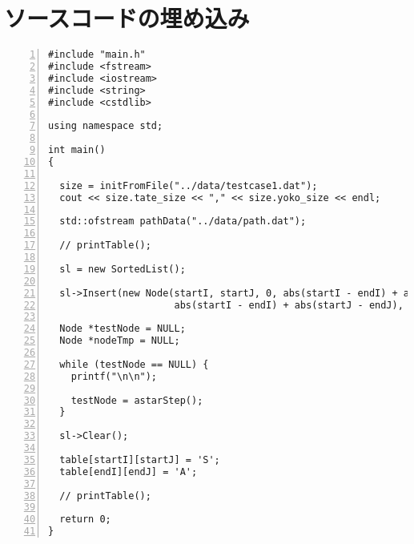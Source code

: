 \documentclass[10pt,a4paper]{jsarticle}
\begin{document}
\section{ソースコードの埋め込み}

\begin{lstlisting}[basicstyle=\ttfamily\footnotesize, frame=single, numbers=left]
#include "main.h"
#include <fstream>
#include <iostream>
#include <string>
#include <cstdlib>

using namespace std;

int main()
{

  size = initFromFile("../data/testcase1.dat");
  cout << size.tate_size << "," << size.yoko_size << endl;

  std::ofstream pathData("../data/path.dat");

  // printTable();

  sl = new SortedList();

  sl->Insert(new Node(startI, startJ, 0, abs(startI - endI) + abs(startJ - endJ),
                      abs(startI - endI) + abs(startJ - endJ), NULL));

  Node *testNode = NULL;
  Node *nodeTmp = NULL;

  while (testNode == NULL) {
    printf("\n\n");

    testNode = astarStep();
  }

  sl->Clear();

  table[startI][startJ] = 'S';
  table[endI][endJ] = 'A';

  // printTable();

  return 0;
}
\end{lstlisting}

\end{document}
